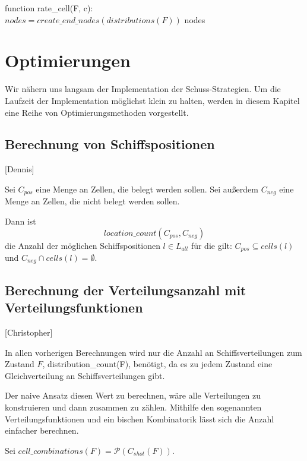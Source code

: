 \documentclass[a4paper,12pt]{llncs}
\numberwithin{equation}{section}
\begin{document}
\begin{algorithm}[H]
 function rate\_cell(F, c):\\
 $nodes=create\_end\_nodes(distributions(F))$\;
  \Return nodes\;
\end{algorithm}






\newpage

\section{Optimierungen}

Wir nähern uns langsam der Implementation der Schuss-Strategien.
Um die Laufzeit der Implementation möglichst klein zu halten, werden in diesem Kapitel eine Reihe von Optimierungsmethoden vorgestellt.

\subsection{Berechnung von Schiffspositionen}[Dennis]
\begin{definition}
Sei $C_{pos}$ eine Menge an Zellen, die belegt werden sollen. Sei außerdem $C_{neg}$ eine Menge an Zellen, die nicht belegt werden sollen.

Dann ist
\[
location\_count(C_{pos}, C_{neg})
\]
die Anzahl der möglichen Schiffspositionen $l \in L_{all}$ für die gilt: $C_{pos} \subseteq cells(l)$ und $C_{neg} \cap cells(l) = \emptyset$.
\end{definition}

\subsection{Berechnung der Verteilungsanzahl mit Verteilungsfunktionen}[Christopher]

In allen vorherigen Berechnungen wird nur die Anzahl an Schiffsverteilungen zum Zustand $F$, distribution\_count(F), benötigt, da es zu jedem Zustand eine Gleichverteilung an Schiffsverteilungen gibt.

Der naive Ansatz diesen Wert zu berechnen, wäre alle Verteilungen zu konstruieren und dann zusammen zu zählen.
Mithilfe den sogenannten Verteilungsfunktionen und ein bischen Kombinatorik lässt sich die Anzahl einfacher berechnen.

\begin{definition}
Sei $cell\_combinations(F)=\mathcal{P}(C_{shot}(F))$.
\end{definition}
\end{document}
